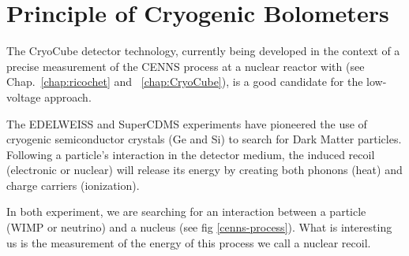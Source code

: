 


\section{Principle of Cryogenic Bolometers}

The CryoCube detector technology, currently being developed in the context of a precise measurement of the CENNS process at a nuclear reactor with \Ricochet{} (see Chap.~\ref{chap:ricochet} and ~\ref{chap:CryoCube}), is a good candidate for the low-voltage approach.

The EDELWEISS and SuperCDMS experiments have pioneered the use of cryogenic semiconductor crystals (Ge and Si) to search for Dark Matter particles. Following a particle's interaction in the detector medium, the induced recoil (electronic or nuclear) will release its energy by creating both phonons (heat) and charge carriers (ionization). 


In both experiment, we are searching for an interaction between a particle (WIMP or neutrino) and a nucleus (see fig \ref{cenns-process}). What is interesting us is the measurement of the energy of this process we call a nuclear recoil. 

